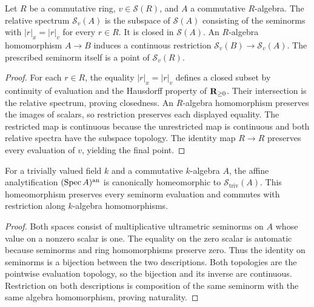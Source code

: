 \begin{definition}\label{spectrum:relative}
\leanok
{}
Let $R$ be a commutative ring, $v\in\mathcal S(R)$, and $A$ a commutative
$R$-algebra. The relative spectrum $\mathcal S_v(A)$ is the subspace
of $\mathcal S(A)$ consisting of the seminorms with
$|r|_x=|r|_v$ for every $r\in R$. It is closed in $\mathcal S(A)$.
An $R$-algebra homomorphism $A\to B$ induces a continuous restriction
$\mathcal S_v(B)\to\mathcal S_v(A)$.
The prescribed seminorm itself is a point of $\mathcal S_v(R)$.
\end{definition}
\begin{proof}
For each $r\in R$, the equality $|r|_x=|r|_v$ defines a closed subset
by continuity of evaluation and the Hausdorff property of $\mathbf{R}_{\ge0}$.
Their intersection is the relative spectrum, proving closedness.
An $R$-algebra homomorphism preserves the images of scalars, so restriction
preserves each displayed equality. The restricted map is continuous because
the unrestricted map is continuous and both relative spectra have the subspace topology.
The identity map $R\to R$ preserves every evaluation of $v$, yielding the final point.
\end{proof}

\begin{theorem}
\label{spectrum:trivial-field-bridge}
\leanok
{}
For a trivially valued field $k$ and a commutative $k$-algebra $A$, the affine
analytification $(\operatorname{Spec} A)^{\mathrm{an}}$ is canonically homeomorphic to
$\mathcal S_{\mathrm{triv}}(A)$. This homeomorphism preserves every seminorm evaluation
and commutes with restriction along $k$-algebra homomorphisms.
\end{theorem}
\begin{proof}
Both spaces consist of multiplicative ultrametric seminorms on $A$ whose value
on a nonzero scalar is one. The equality on the zero scalar is automatic because
seminorms and ring homomorphisms preserve zero. Thus the identity on seminorms
is a bijection between the two descriptions. Both topologies are the pointwise
evaluation topology, so the bijection and its inverse are continuous.
Restriction on both descriptions is composition of the same seminorm with the
same algebra homomorphism, proving naturality.
\end{proof}
